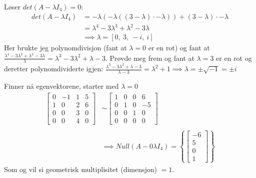 \documentclass[11pt, a4paper, norsk]{NTNUoving}
\begin{document}
\begin{oppgave}
\begin{punkt}
            Løser $det(A - \lambda I_4) = 0$:
            \begin{align*}
                det(A - \lambda I_4) &= -\lambda(-\lambda((3-\lambda) \cdot -\lambda)) + (3 - \lambda) \cdot -\lambda
                \\
                                     &= \lambda^4 - 3\lambda^3 + \lambda^2 - 3\lambda
                                     \\
                                     &\implies \lambda = \left[ 0, \  3, \  - i, \  i\right]
            \end{align*}
            Her brukte jeg polynomdivisjon (fant at $\lambda = 0$ er en rot) og fant at $\frac{\lambda^4 - 3\lambda^3 +\lambda^2 -3\lambda}{\lambda} = \lambda^3 - 3\lambda^2 + \lambda -3$. Prøvde meg frem og fant at $\lambda = 3$ er en rot og deretter polynomdividerte igjen: $\frac{\lambda^3 - 3\lambda^2 + \lambda -3}{\lambda-3} = \lambda^2 + 1 \implies \lambda = \pm \sqrt{-1} = \pm i$

            Finner nå egenvektorene, starter med $\lambda = 0$
            \begin{align*}
                \begin{bmatrix}
                    0 & -1 & 1 & 5 \\
                    1 & 0 & 2 & 6 \\
                    0 & 0 & 3 & 0 \\
                    0 & 0 & 4 & 0
                \end{bmatrix} &\sim \begin{bmatrix}
                1 & 0 & 0 & 6 \\
                0 & 1 & 0 & -5 \\
                0 & 0 & 1 & 0 \\
                0 & 0 & 0 & 0
                \end{bmatrix}
                \\
                \\
                &\implies Null(A - 0\lambda I_4) = \left\{\begin{bmatrix}
                    -6 \\
                    5 \\
                    0 \\
                    1
            \end{bmatrix}\right\}
            \end{align*}
            Som og vil si geometrisk multiplisitet (dimensjon) $=1$.


\end{punkt}
\end{oppgave}
\end{document}
